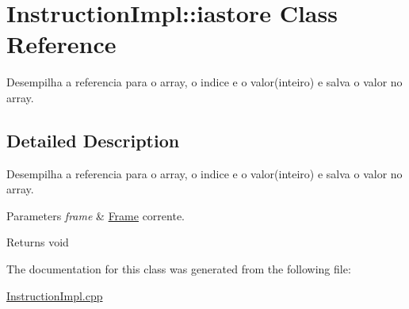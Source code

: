 \hypertarget{class_instruction_impl_1_1iastore}{}\section{Instruction\+Impl\+:\+:iastore Class Reference}
\label{class_instruction_impl_1_1iastore}


Desempilha a referencia para o array, o indice e o valor(inteiro) e salva o valor no array.  




\subsection{Detailed Description}
Desempilha a referencia para o array, o indice e o valor(inteiro) e salva o valor no array. 


\begin{DoxyParams}{Parameters}
{\em frame} & \hyperlink{struct_frame}{Frame} corrente. \\
\hline
\end{DoxyParams}
\begin{DoxyReturn}{Returns}
void 
\end{DoxyReturn}


The documentation for this class was generated from the following file\+:\begin{DoxyCompactItemize}
\item 
\hyperlink{_instruction_impl_8cpp}{Instruction\+Impl.\+cpp}\end{DoxyCompactItemize}

